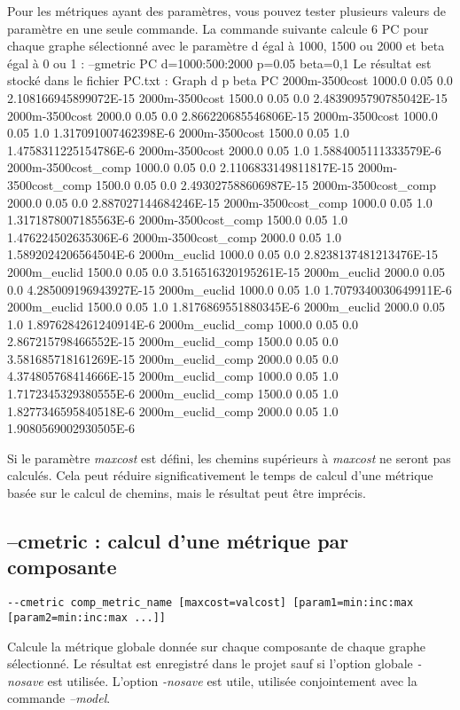 \documentclass[a4paper,10pt]{report}
\newenvironment{cmd}
{\quote\Verbatim}
{\endVerbatim\endquote}
\begin{document}
Pour les métriques ayant des paramètres, vous pouvez tester plusieurs valeurs de paramètre en une seule commande.
La commande suivante calcule 6 PC pour chaque graphe sélectionné avec le paramètre d égal à 1000, 1500 ou 2000 et beta égal à 0 ou 1 :
\begin{cmd}
--gmetric PC d=1000:500:2000 p=0.05 beta=0,1
\end{cmd}
Le résultat est stocké dans le fichier PC.txt :
\begin{cmd}
Graph               d     	p   	beta	PC
2000m-3500cost      1000.0	0.05	0.0	2.108166945899072E-15
2000m-3500cost      1500.0	0.05	0.0	2.4839095790785042E-15
2000m-3500cost      2000.0	0.05	0.0	2.866220685546806E-15
2000m-3500cost      1000.0	0.05	1.0	1.317091007462398E-6
2000m-3500cost      1500.0	0.05	1.0	1.4758311225154786E-6
2000m-3500cost      2000.0	0.05	1.0	1.5884005111333579E-6
2000m-3500cost_comp 1000.0	0.05	0.0	2.1106833149811817E-15
2000m-3500cost_comp 1500.0	0.05	0.0	2.493027588606987E-15
2000m-3500cost_comp 2000.0	0.05	0.0	2.887027144684246E-15
2000m-3500cost_comp 1000.0	0.05	1.0	1.3171878007185563E-6
2000m-3500cost_comp 1500.0	0.05	1.0	1.476224502635306E-6
2000m-3500cost_comp 2000.0	0.05	1.0	1.5892024206564504E-6
2000m_euclid        1000.0	0.05	0.0	2.8238137481213476E-15
2000m_euclid        1500.0	0.05	0.0	3.516516320195261E-15
2000m_euclid        2000.0	0.05	0.0	4.285009196943927E-15
2000m_euclid        1000.0	0.05	1.0	1.7079340030649911E-6
2000m_euclid        1500.0	0.05	1.0	1.8176869551880345E-6
2000m_euclid        2000.0	0.05	1.0	1.8976284261240914E-6
2000m_euclid_comp   1000.0	0.05	0.0	2.867215798466552E-15
2000m_euclid_comp   1500.0	0.05	0.0	3.581685718161269E-15
2000m_euclid_comp   2000.0	0.05	0.0	4.374805768414666E-15
2000m_euclid_comp   1000.0	0.05	1.0	1.7172345329380555E-6
2000m_euclid_comp   1500.0	0.05	1.0	1.8277346595840518E-6
2000m_euclid_comp   2000.0	0.05	1.0	1.9080569002930505E-6
\end{cmd}

Si le paramètre \textit{maxcost} est défini, les chemins supérieurs à \textit{maxcost} ne seront pas calculés. 
Cela peut réduire significativement le temps de calcul d'une métrique basée sur le calcul de chemins, mais le résultat peut être imprécis.

\subsection{--cmetric : calcul d'une métrique par composante}
\begin{verbatim}
--cmetric comp_metric_name [maxcost=valcost] [param1=min:inc:max [param2=min:inc:max ...]]
\end{verbatim}
Calcule la métrique globale donnée sur chaque composante de chaque graphe sélectionné.
Le résultat est enregistré dans le projet sauf si l'option globale \textit{-nosave} est utilisée. L'option \textit{-nosave} est utile, utilisée conjointement avec la commande \textit{--model}.
\end{document}
